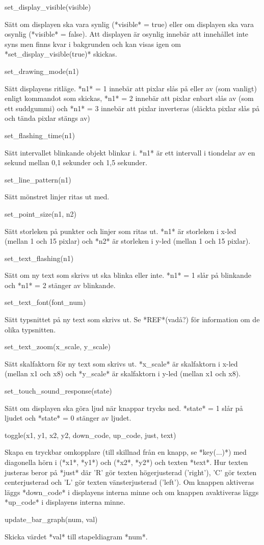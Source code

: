 set\_display\_visible(visible)

Sätt om displayen ska vara synlig (*visible* = true) eller om displayen
ska vara osynlig (*visible* = false). Att displayen är osynlig innebär
att innehållet inte syns men finns kvar i bakgrunden och kan visas igen
om *set\_display\_visible(true)* skickas.

set\_drawing\_mode(n1)

Sätt displayens ritläge. *n1* = 1 innebär att pixlar slås på eller av
(som vanligt) enligt kommandot som skickas, *n1* = 2 innebär att pixlar
enbart slås av (som ett suddgummi) och *n1* = 3 innebär att pixlar
inverteras (släckta pixlar slås på och tända pixlar stängs av)

set\_flashing\_time(n1)

Sätt intervallet blinkande objekt blinkar i. *n1* är ett intervall i
tiondelar av en sekund mellan 0,1 sekunder och 1,5 sekunder.

set\_line\_pattern(n1)

Sätt mönstret linjer ritas ut med.

set\_point\_size(n1, n2)

Sätt storleken på punkter och linjer som ritas ut. *n1* är storleken i
x-led (mellan 1 och 15 pixlar) och *n2* är storleken i y-led (mellan 1
och 15 pixlar).

set\_text\_flashing(n1)

Sätt om ny text som skrivs ut ska blinka eller inte. *n1* = 1 slår på
blinkande och *n1* = 2 stänger av blinkande.

set\_text\_font(font\_num)

Sätt typsnittet på ny text som skrivs ut. Se *REF*(vadå?) för information om de
olika typsnitten.

set\_text\_zoom(x\_scale, y\_scale)

Sätt skalfaktorn för ny text som skrivs ut. *x\_scale* är skalfaktorn i
x-led (mellan x1 och x8) och *y\_scale* är skalfaktorn i y-led (mellan
x1 och x8).

set\_touch\_sound\_response(state)

Sätt om displayen ska göra ljud när knappar trycks ned. *state* = 1 slår
på ljudet och *state* = 0 stänger av ljudet.

toggle(x1, y1, x2, y2, down\_code, up\_code, just, text)

Skapa en tryckbar omkopplare (till skillnad från en knapp, se
*key(...)*) med diagonella hörn i (*x1*, *y1*) och (*x2*, *y2*) och
texten *text*. Hur texten justeras beror på *just* där 'R' gör texten
högerjusterad ('right'), 'C' gör texten centerjusterad och 'L' gör
texten vänsterjusterad ('left'). Om knappen aktiveras läggs *down\_code*
i displayens interna minne och om knappen avaktiveras läggs *up\_code* i
displayens interna minne.

update\_bar\_graph(num, val)

Skicka värdet *val* till stapeldiagram *num*.
